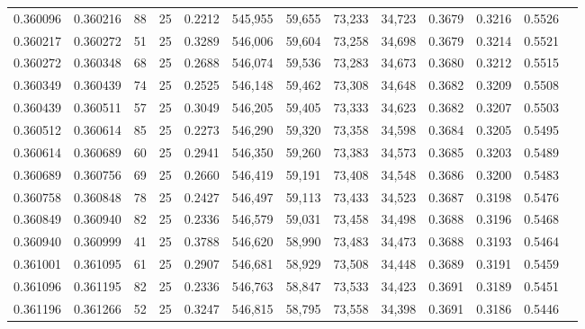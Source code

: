\begin{tabular}{rrrrrrrrrrrrr}
0.360096 & 0.360216 &    88 &  25 &                                     0.2212 & 545,955 &  59,655 &  73,233 &  34,723 & 0.3679 & 0.3216 & 0.5526 \\
0.360217 & 0.360272 &    51 &  25 &                                     0.3289 & 546,006 &  59,604 &  73,258 &  34,698 & 0.3679 & 0.3214 & 0.5521 \\
0.360272 & 0.360348 &    68 &  25 &                                     0.2688 & 546,074 &  59,536 &  73,283 &  34,673 & 0.3680 & 0.3212 & 0.5515 \\
0.360349 & 0.360439 &    74 &  25 &                                     0.2525 & 546,148 &  59,462 &  73,308 &  34,648 & 0.3682 & 0.3209 & 0.5508 \\
0.360439 & 0.360511 &    57 &  25 &                                     0.3049 & 546,205 &  59,405 &  73,333 &  34,623 & 0.3682 & 0.3207 & 0.5503 \\
0.360512 & 0.360614 &    85 &  25 &                                     0.2273 & 546,290 &  59,320 &  73,358 &  34,598 & 0.3684 & 0.3205 & 0.5495 \\
0.360614 & 0.360689 &    60 &  25 &                                     0.2941 & 546,350 &  59,260 &  73,383 &  34,573 & 0.3685 & 0.3203 & 0.5489 \\
0.360689 & 0.360756 &    69 &  25 &                                     0.2660 & 546,419 &  59,191 &  73,408 &  34,548 & 0.3686 & 0.3200 & 0.5483 \\
0.360758 & 0.360848 &    78 &  25 &                                     0.2427 & 546,497 &  59,113 &  73,433 &  34,523 & 0.3687 & 0.3198 & 0.5476 \\
0.360849 & 0.360940 &    82 &  25 &                                     0.2336 & 546,579 &  59,031 &  73,458 &  34,498 & 0.3688 & 0.3196 & 0.5468 \\
0.360940 & 0.360999 &    41 &  25 &                                     0.3788 & 546,620 &  58,990 &  73,483 &  34,473 & 0.3688 & 0.3193 & 0.5464 \\
0.361001 & 0.361095 &    61 &  25 &                                     0.2907 & 546,681 &  58,929 &  73,508 &  34,448 & 0.3689 & 0.3191 & 0.5459 \\
0.361096 & 0.361195 &    82 &  25 &                                     0.2336 & 546,763 &  58,847 &  73,533 &  34,423 & 0.3691 & 0.3189 & 0.5451 \\
0.361196 & 0.361266 &    52 &  25 &                                     0.3247 & 546,815 &  58,795 &  73,558 &  34,398 & 0.3691 & 0.3186 & 0.5446 \\

\end{tabular}
